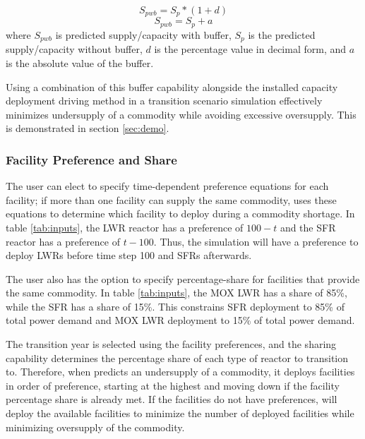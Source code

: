     \begin{equation}
        \label{eq:perc}
        S_{pwb} = S_{p}*(1+d)
    \end{equation}
    \begin{equation}
        \label{eq:abs}
        S_{pwb} = S_{p}+a
    \end{equation}
    where $S_{pwb}$ is predicted supply/capacity with buffer, 
    $S_p$ is the predicted supply/capacity without buffer, 
    $d$ is the percentage value in decimal form, 
    and $a$ is the absolute value of the buffer. 
    
    Using a combination of this buffer capability alongside the 
    installed capacity deployment driving method in a transition 
    scenario simulation effectively minimizes undersupply of a 
    commodity while avoiding excessive oversupply. 
    This is demonstrated in section \ref{sec:demo}. 
    
    \subsubsection{\textbf{Facility Preference and Share}}
    The user can elect to specify time-dependent preference equations 
    for each facility; if more than one facility can supply the same 
    commodity, \deploy uses these equations to determine which facility 
    to deploy during a commodity shortage. 
    In table \ref{tab:inputs}, 
    the \gls{LWR} reactor has a preference of $100-t$ and the 
    \gls{SFR} reactor has a preference of $t-100$. 
    Thus, the simulation will have a preference to deploy 
    \glspl{LWR} before time step 100 and \glspl{SFR} afterwards. 
    
    The user also has the option to specify percentage-share for facilities 
    that provide the same commodity.   
    In table \ref{tab:inputs}, 
    the \gls{MOX} \gls{LWR} has a share of 85\%, while 
    the \gls{SFR} has a share of 15\%. 
    This constrains \gls{SFR} deployment to 85\% of total power demand 
    and \gls{MOX} \gls{LWR} deployment to 15\% of total power demand.  

    The transition year is selected using the facility 
    preferences, and the sharing capability determines the percentage 
    share of each type of reactor to transition to. 
    Therefore, when \deploy predicts an undersupply of a commodity, 
    it deploys facilities in order of preference, starting at 
    the highest and moving down if the facility percentage share 
    is already met. 
    If the facilities do not have preferences, \deploy 
    will deploy the available facilities to minimize the number of 
    deployed facilities while minimizing oversupply of the commodity.

